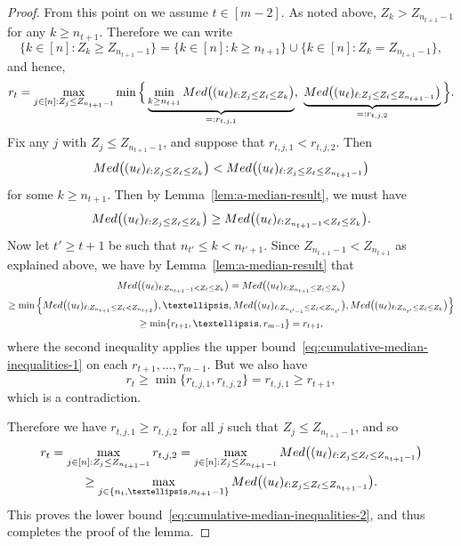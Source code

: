 \documentclass[12pt]{article}
\begin{document}
\begin{proof}
From this point on we assume $t\in[m-2]$. 
As noted above, $Z_k > Z_{n_{t+1}-1}$ for any $k\geq n_{t+1}$. 
Therefore we can write
\[
\{k\in[n]: Z_k \geq Z_{n_{t+1}-1}\} = \{k\in[n]: k\geq n_{t+1}\} \cup \{k\in[n]: Z_k = Z_{n_{t+1}-1}\},
\]
and hence,
\[
r_t = \max_{j\in[n]:Z_j \leq Z_{n_{t+1}-1}}\min\Big\{\underbrace{\min_{k\geq n_{t+1}}\textnormal{Med}\bigl((u_\ell)_{\ell:Z_j\leq Z_\ell\leq Z_k}\bigr)}_{=:r_{t,j,1}} , \ \underbrace{ \textnormal{Med}\bigl((u_\ell)_{\ell:Z_j\leq Z_\ell\leq Z_{n_{t+1}-1}}\bigr)}_{=:r_{t,j,2}}\Big\}.
\]
Fix any $j$ with $Z_j \leq Z_{n_{t+1}-1}$, and suppose that $r_{t,j,1} < r_{t,j,2}$. Then
\[
\textnormal{Med}\bigl((u_\ell)_{\ell:Z_j\leq Z_\ell\leq Z_k}\bigr) < \textnormal{Med}\bigl((u_\ell)_{\ell:Z_j\leq Z_\ell\leq Z_{n_{t+1}-1}}\bigr)
\]
for some $k\geq n_{t+1}$. Then by Lemma~\ref{lem:a-median-result}, we must have
 \[\textnormal{Med}\bigl((u_\ell)_{\ell:Z_j\leq Z_\ell\leq Z_k}\bigr) \geq \textnormal{Med}\bigl((u_\ell)_{\ell:Z_{n_{t+1}-1}< Z_\ell\leq Z_k}\bigr).\]
Now let $t' \geq t+1$ be such that $n_{t'}\leq k < n_{t'+1}$.  Since $Z_{n_{t+1}-1} < Z_{n_{t+1}}$ as explained above, we have by Lemma~\ref{lem:a-median-result} that 
\begin{multline*}
\textnormal{Med}\bigl((u_\ell)_{\ell:Z_{n_{t+1}-1}< Z_\ell\leq Z_k}\bigr) = \textnormal{Med}\bigl((u_\ell)_{\ell:Z_{n_{t+1}}\leq Z_\ell\leq Z_k}\bigr) \\\geq \min\left\{\textnormal{Med}\bigl((u_\ell)_{\ell:Z_{n_{t+1}}\leq Z_\ell < Z_{n_{t+2}}}\bigr), \dots,\textnormal{Med}\bigl((u_\ell)_{\ell:Z_{n_{t'-1}}\leq Z_\ell < Z_{n_{t'}}}\bigr),\textnormal{Med}\bigl((u_\ell)_{\ell:Z_{n_{t'}}\leq Z_\ell \leq Z_k}\bigr)\right\}\\\geq \min\{r_{t+1},\dots,r_{m-1}\} = r_{t+1},
\end{multline*}
where the second inequality applies the upper bound~\eqref{eq:cumulative-median-inequalities-1} on each $r_{t+1},\dots,r_{m-1}$. But we also have
\[
r_t \geq \min\{r_{t,j,1},r_{t,j,2}\} = r_{t,j,1} \geq r_{t+1},
\]
which is a contradiction.

Therefore we have $r_{t,j,1}\geq r_{t,j,2}$ for all $j$ such that $Z_j \leq Z_{n_{t+1}-1}$, and so
\begin{multline*}
r_t = \max_{j\in[n]:Z_j \leq Z_{n_{t+1}-1}}r_{t,j,2} = \max_{j\in[n]:Z_j \leq Z_{n_{t+1}-1}} \textnormal{Med}\bigl((u_\ell)_{\ell:Z_j\leq Z_\ell\leq Z_{n_{t+1}-1}}\bigr) \\\geq \max_{j\in\{n_t,\dots,n_{t+1}-1\}}\textnormal{Med}\bigl((u_\ell)_{\ell:Z_j\leq Z_\ell\leq Z_{n_{t+1}-1}}\bigr).
\end{multline*}
This proves the lower bound~\eqref{eq:cumulative-median-inequalities-2}, and thus completes the proof of the lemma.
\end{proof}
 
\end{document}
